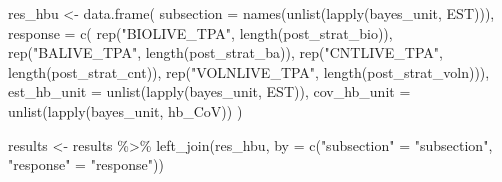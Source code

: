 \documentclass[12pt,twoside]{reedthesis}
\newenvironment{Shaded}{\begin{snugshade}}{\end{snugshade}}
\newcommand{\AttributeTok}[1]{\textcolor[rgb]{0.77,0.63,0.00}{#1}}
\newcommand{\FunctionTok}[1]{\textcolor[rgb]{0.00,0.00,0.00}{#1}}
\newcommand{\NormalTok}[1]{#1}
\newcommand{\OtherTok}[1]{\textcolor[rgb]{0.56,0.35,0.01}{#1}}
\newcommand{\SpecialCharTok}[1]{\textcolor[rgb]{0.00,0.00,0.00}{#1}}
\newcommand{\StringTok}[1]{\textcolor[rgb]{0.31,0.60,0.02}{#1}}
\begin{document}
\begin{Shaded}
\begin{Highlighting}[]
\NormalTok{res\_hbu }\OtherTok{\textless{}{-}} \FunctionTok{data.frame}\NormalTok{(}
  \AttributeTok{subsection =} \FunctionTok{names}\NormalTok{(}\FunctionTok{unlist}\NormalTok{(}\FunctionTok{lapply}\NormalTok{(bayes\_unit, EST))),}
\AttributeTok{response =} \FunctionTok{c}\NormalTok{(}
    \FunctionTok{rep}\NormalTok{(}\StringTok{"BIOLIVE\_TPA"}\NormalTok{, }\FunctionTok{length}\NormalTok{(post\_strat\_bio)),}
    \FunctionTok{rep}\NormalTok{(}\StringTok{"BALIVE\_TPA"}\NormalTok{, }\FunctionTok{length}\NormalTok{(post\_strat\_ba)),}
    \FunctionTok{rep}\NormalTok{(}\StringTok{"CNTLIVE\_TPA"}\NormalTok{, }\FunctionTok{length}\NormalTok{(post\_strat\_cnt)),}
    \FunctionTok{rep}\NormalTok{(}\StringTok{"VOLNLIVE\_TPA"}\NormalTok{, }\FunctionTok{length}\NormalTok{(post\_strat\_voln))),}
  \AttributeTok{est\_hb\_unit =} \FunctionTok{unlist}\NormalTok{(}\FunctionTok{lapply}\NormalTok{(bayes\_unit, EST)),}
  \AttributeTok{cov\_hb\_unit =} \FunctionTok{unlist}\NormalTok{(}\FunctionTok{lapply}\NormalTok{(bayes\_unit, hb\_CoV))}
\NormalTok{)}

\NormalTok{results }\OtherTok{\textless{}{-}}\NormalTok{ results }\SpecialCharTok{\%\textgreater{}\%}
  \FunctionTok{left\_join}\NormalTok{(res\_hbu, }\AttributeTok{by =} \FunctionTok{c}\NormalTok{(}\StringTok{"subsection"} \OtherTok{=} \StringTok{"subsection"}\NormalTok{,}
                        \StringTok{"response"} \OtherTok{=} \StringTok{"response"}\NormalTok{))}
\end{Highlighting}
\end{Shaded}
\end{document}
